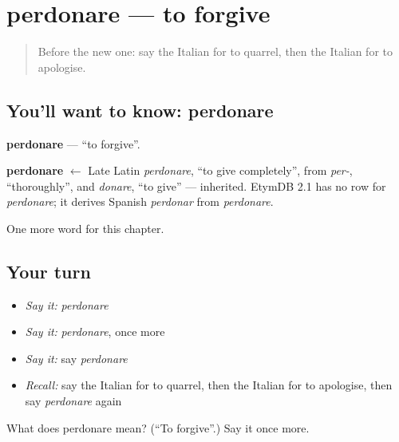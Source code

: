 \section[perdonare]{perdonare — to forgive}

\label{lesson:IT-C143-perdonare}



\begin{quote}
Before the new one: say the Italian for to quarrel, then the Italian for to apologise.
\end{quote}

\subsection*{You'll want to know: perdonare}
\textbf{perdonare} — \textquotedblleft{}to forgive\textquotedblright{}.

\begin{cousinweb}
\textbf{perdonare} $\leftarrow$ Late Latin \emph{perdonare}, \textquotedblleft{}to give completely\textquotedblright{}, from \emph{per-}, \textquotedblleft{}thoroughly\textquotedblright{}, and \emph{donare}, \textquotedblleft{}to give\textquotedblright{} — inherited. EtymDB 2.1 has no row for \emph{perdonare}; it derives Spanish \emph{perdonar} from \emph{perdonare}.
\end{cousinweb}

\begin{grammarlens}[title={What you've built}]
One more word for this chapter.
\end{grammarlens}

\subsection*{Your turn}
\begin{itemize}
\raggedright
  \item \emph{Say it:} \emph{perdonare}
  \item \emph{Say it:} \emph{perdonare}, once more
  \item \emph{Say it:} say \emph{perdonare}
  \item \emph{Recall:} say the Italian for to quarrel, then the Italian for to apologise, then say \emph{perdonare} again
\end{itemize}

\begin{tcolorbox}[breakable,colback=teal!4,colframe=teal!35!black,title={Before you move on}]
What does perdonare mean? (\textquotedblleft{}To forgive\textquotedblright{}.) Say it once more.
\end{tcolorbox}
